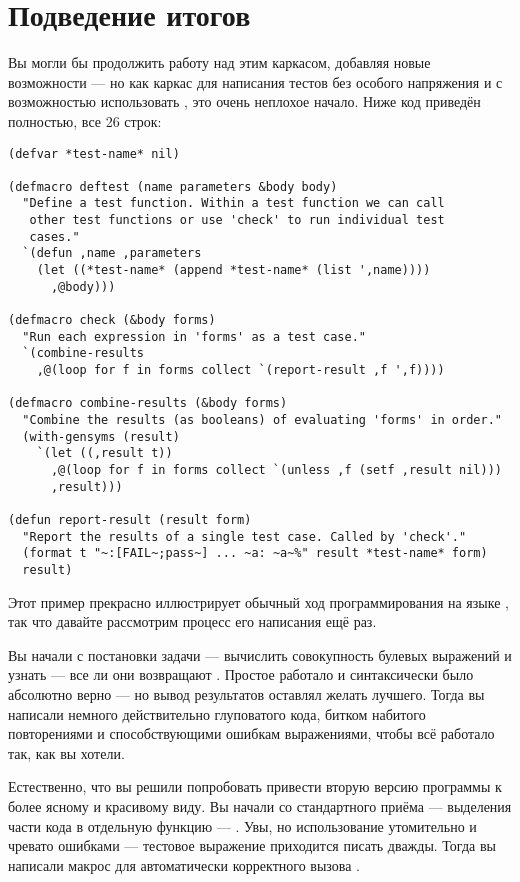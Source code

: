\section{Подведение итогов}

Вы могли бы продолжить работу над этим каркасом, добавляя новые возможности --- но как
каркас для написания тестов без особого напряжения и с возможностью использовать
, это очень неплохое начало. Ниже код приведён полностью, все 26 строк:

\begin{lstlisting}
(defvar *test-name* nil)

(defmacro deftest (name parameters &body body)
  "Define a test function. Within a test function we can call
   other test functions or use 'check' to run individual test
   cases."
  `(defun ,name ,parameters
    (let ((*test-name* (append *test-name* (list ',name))))
      ,@body)))

(defmacro check (&body forms)
  "Run each expression in 'forms' as a test case."
  `(combine-results
    ,@(loop for f in forms collect `(report-result ,f ',f))))

(defmacro combine-results (&body forms)
  "Combine the results (as booleans) of evaluating 'forms' in order."
  (with-gensyms (result)
    `(let ((,result t))
      ,@(loop for f in forms collect `(unless ,f (setf ,result nil)))
      ,result)))

(defun report-result (result form)
  "Report the results of a single test case. Called by 'check'."
  (format t "~:[FAIL~;pass~] ... ~a: ~a~%" result *test-name* form)
  result)
\end{lstlisting}

Этот пример прекрасно иллюстрирует обычный ход программирования на языке , так
что давайте рассмотрим процесс его написания ещё раз.

Вы начали с постановки задачи --- вычислить совокупность булевых выражений и узнать ---
все ли они возвращают . Простое  работало и синтаксически было
абсолютно верно --- но вывод результатов оставлял желать лучшего. Тогда вы написали
немного действительно глуповатого кода, битком набитого повторениями и способствующими
ошибкам выражениями, чтобы всё работало так, как вы хотели.

Естественно, что вы решили попробовать привести вторую версию программы к более ясному и
красивому виду. Вы начали со стандартного приёма --- выделения части кода в отдельную
функцию --- . Увы, но использование  утомительно и
чревато ошибками --- тестовое выражение приходится писать дважды. Тогда вы написали макрос
 для автоматически корректного вызова .

